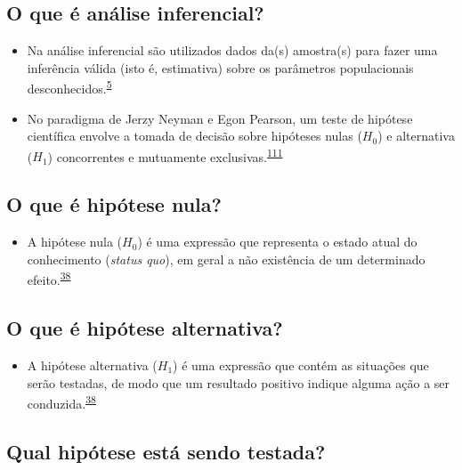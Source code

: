 \documentclass[
]{book}
\providecommand{\tightlist}{%
  \setlength{\itemsep}{0pt}\setlength{\parskip}{0pt}}
\begin{document}
\hypertarget{o-que-uxe9-anuxe1lise-inferencial}{%
\subsection{O que é análise inferencial?}\label{o-que-uxe9-anuxe1lise-inferencial}}

\begin{itemize}
\item
  Na análise inferencial são utilizados dados da(s) amostra(s) para fazer uma inferência válida (isto é, estimativa) sobre os parâmetros populacionais desconhecidos.\textsuperscript{\protect\hyperlink{ref-vetter2017}{5}}
\item
  No paradigma de Jerzy Neyman e Egon Pearson, um teste de hipótese científica envolve a tomada de decisão sobre hipóteses nulas (\(H_{0}\)) e alternativa (\(H_{1}\)) concorrentes e mutuamente exclusivas.\textsuperscript{\protect\hyperlink{ref-Curran-Everett2009}{111}}
\end{itemize}

\hypertarget{o-que-uxe9-hipuxf3tese-nula}{%
\subsection{O que é hipótese nula?}\label{o-que-uxe9-hipuxf3tese-nula}}

\begin{itemize}
\tightlist
\item
  A hipótese nula (\(H_{0}\)) é uma expressão que representa o estado atual do conhecimento (\emph{status quo}), em geral a não existência de um determinado efeito.\textsuperscript{\protect\hyperlink{ref-kanji2006}{38}}
\end{itemize}

\hypertarget{o-que-uxe9-hipuxf3tese-alternativa}{%
\subsection{O que é hipótese alternativa?}\label{o-que-uxe9-hipuxf3tese-alternativa}}

\begin{itemize}
\tightlist
\item
  A hipótese alternativa (\(H_{1}\)) é uma expressão que contém as situações que serão testadas, de modo que um resultado positivo indique alguma ação a ser conduzida.\textsuperscript{\protect\hyperlink{ref-kanji2006}{38}}
\end{itemize}

\hypertarget{qual-hipuxf3tese-estuxe1-sendo-testada}{%
\subsection{Qual hipótese está sendo testada?}\label{qual-hipuxf3tese-estuxe1-sendo-testada}}
\end{document}
